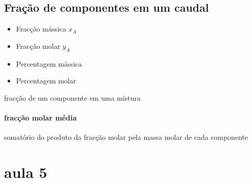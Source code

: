 \documentclass[12pt]{article}
\begin{document}
\subsection{Fração de componentes em um caudal}
\begin{itemize}
\item Fracção mássica $x_A$
\item Fracção molar $y_A$
\item Percentagem mássica
\item Percentagem molar
\end{itemize}

fracção de um componente em uma mistura

\paragraph{fracção molar média}
somatório do produto da fracção molar pela massa molar de cada componente

\section{aula 5}
\end{document}
